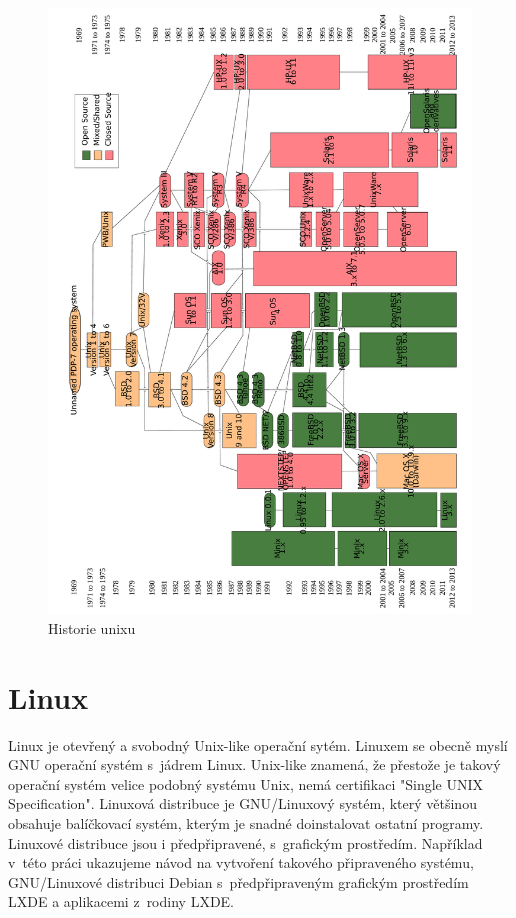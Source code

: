 \documentclass[thesis=M,czech]{FITthesis}[2012/06/26]
\begin{document}
\begin{figure}
	\includegraphics[width=1.0\textwidth]{./images/Unix_history-simple_rot_big}
	\caption{Historie unixu}
	\label{fig:unixhistory}
\end{figure}



\section{Linux}
Linux je otevřený a svobodný Unix-like operační sytém. Linuxem se obecně myslí GNU operační systém s~jádrem Linux. Unix-like znamená, že přestože je takový operační systém velice podobný systému Unix, nemá certifikaci "Single UNIX Specification". Linuxová distribuce je GNU/Linuxový systém, který většinou obsahuje balíčkovací systém, kterým je snadné doinstalovat ostatní programy. Linuxové distribuce jsou i předpřipravené, s~grafickým prostředím. Například v~této práci ukazujeme návod na vytvoření takového připraveného systému, GNU/Linuxové distribuci Debian s~předpřipraveným grafickým prostředím LXDE a aplikacemi z~rodiny LXDE.
\end{document}
